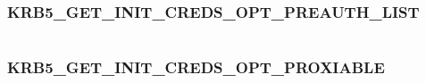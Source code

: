 \documentclass[letterpaper,10pt,english]{sphinxmanual}
\begin{document}
\begin{fulllineitems}
\label{appdev/refs/macros/KRB5_GET_INIT_CREDS_OPT_FORWARDABLE:KRB5_GET_INIT_CREDS_OPT_FORWARDABLE}
\end{fulllineitems}


\begin{tabulary}{\linewidth}{|L|L|}
\hline

 & 
\\
\hline\end{tabulary}



\subsubsection{KRB5\_GET\_INIT\_CREDS\_OPT\_PREAUTH\_LIST}
\label{appdev/refs/macros/KRB5_GET_INIT_CREDS_OPT_PREAUTH_LIST:krb5-get-init-creds-opt-preauth-list}\label{appdev/refs/macros/KRB5_GET_INIT_CREDS_OPT_PREAUTH_LIST:krb5-get-init-creds-opt-preauth-list-data}\label{appdev/refs/macros/KRB5_GET_INIT_CREDS_OPT_PREAUTH_LIST::doc}

\begin{fulllineitems}
\label{appdev/refs/macros/KRB5_GET_INIT_CREDS_OPT_PREAUTH_LIST:KRB5_GET_INIT_CREDS_OPT_PREAUTH_LIST}
\end{fulllineitems}


\begin{tabulary}{\linewidth}{|L|L|}
\hline

 & 
\\
\hline\end{tabulary}



\subsubsection{KRB5\_GET\_INIT\_CREDS\_OPT\_PROXIABLE}
\label{appdev/refs/macros/KRB5_GET_INIT_CREDS_OPT_PROXIABLE:krb5-get-init-creds-opt-proxiable-data}\label{appdev/refs/macros/KRB5_GET_INIT_CREDS_OPT_PROXIABLE:krb5-get-init-creds-opt-proxiable}\label{appdev/refs/macros/KRB5_GET_INIT_CREDS_OPT_PROXIABLE::doc}
\end{document}

